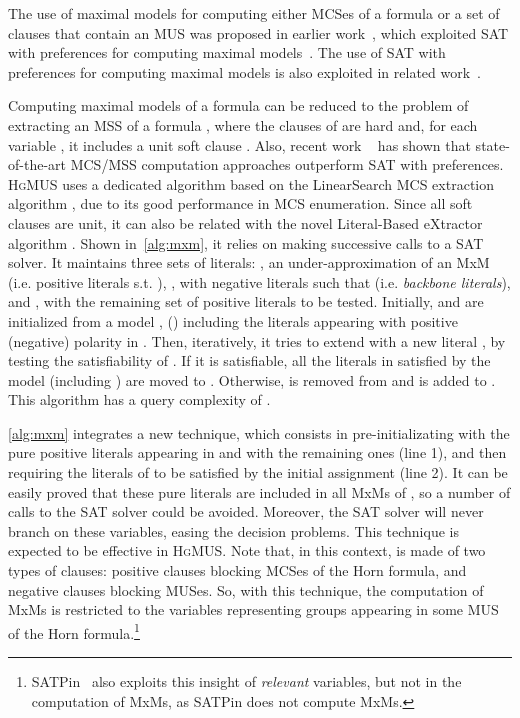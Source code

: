 \documentclass{llncs}
\begin{document}
The use of maximal models for computing either MCSes of a formula or a
set of clauses that contain an MUS was proposed in earlier
work~\cite{pms-aaai13}, which exploited SAT with preferences for
computing maximal
models~\cite{giunchiglia-ecai06,giunchiglia-aicomm13}.
The use of SAT with preferences for computing maximal models is also
exploited in related work~\cite{sebastiani-cade09,sebastiani-tr15}.


Computing maximal models of a formula  can be reduced to the problem of 
extracting an MSS of a formula  \cite{mshjpb-ijcai13}, where the clauses of  are hard and, for each variable , it includes a unit soft clause .
Also, recent work ~\cite{mshjpb-ijcai13,mazure-aaai14,bacchus-aaai14b,mpms-ijcai15} has shown that state-of-the-art MCS/MSS computation approaches outperform SAT with preferences.
\textsc{HgMUS} uses a dedicated algorithm based on the LinearSearch MCS extraction algorithm \cite{mshjpb-ijcai13}, due to its good performance in MCS enumeration. Since all soft clauses are unit, it can also be related with the novel Literal-Based eXtractor algorithm \cite{mpms-ijcai15}. Shown in~\autoref{alg:mxm}, it relies on making successive calls to a SAT solver. It maintains three sets of literals: , an under-approximation of an MxM (i.e. positive literals s.t. ), , with negative literals  such that  (i.e. \textit{backbone literals}), and , with the remaining set of positive literals to be tested. Initially,  and  are initialized from a model ,  () including the literals appearing with positive (negative) polarity in . Then, iteratively, it tries to extend  with a new literal , by testing the satisfiability of . If it is satisfiable, all the literals in  satisfied by the model (including ) are moved to . Otherwise,  is removed from  and  is added to . This algorithm has a query complexity of . 

\autoref{alg:mxm} integrates a new technique, which consists in pre-initializating  with the pure positive literals appearing in  and  with the remaining ones (line 1), and then requiring the literals of  to be satisfied by the initial assignment (line 2). It can be easily proved that these pure literals are included in all MxMs of , so a number of calls to the SAT solver could be avoided. Moreover, the SAT solver will never branch on these variables, easing the decision problems.
This technique is expected to be effective in \textsc{HgMUS}. Note that, in this context,  is made of two types of clauses: positive clauses blocking MCSes of the Horn formula, and negative clauses blocking MUSes. So, with this technique, the computation of MxMs is restricted to the variables representing groups appearing in some MUS of the Horn formula.\footnote{SATPin~\cite{mp-tr15} also exploits this insight of \textit{relevant} variables, but not in the computation of MxMs, as SATPin does not compute MxMs.}
\end{document}
